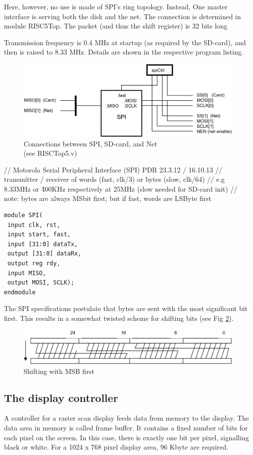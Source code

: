Here, however, no use is made of SPI's ring topology. Instead, One master interface is serving both the disk
and the net. The connection is determined in module RISC5Top. The packet (and thus the shift register)
is 32 bits long

Transmission frequency is 0.4 MHz at startup (as required by the SD-card), and then is raised to
8.33 MHz. Details are shown in the respective program listing.
\begin{figure}[h!]
  \centering
  \includegraphics[width=\textwidth]{i/G/7.png}
  \caption{Connections between SPI, SD-card, and Net\\(see RISCTop5.v)}
  \label{fig:spi}
\end{figure}

// Motorola Serial Peripheral Interface (SPI) PDR 23.3.12 / 16.10.13
// transmitter / receiver of words (fast, clk/3) or bytes (slow, clk/64)
// e.g 8.33MHz or \~400KHz respectively at 25MHz (slow needed for SD-card init)
// note: bytes are always MSbit first; but if fast, words are LSByte first
\begin{verbatim}
module SPI(
 input clk, rst,
 input start, fast,
 input [31:0] dataTx,
 output [31:0] dataRx,
 output reg rdy,
 input MISO,
 output MOSI, SCLK);
endmodule
\end{verbatim}

The SPI specifications postulate that bytes are sent with the most significant bit first. This results in
a somewhat twisted scheme for shifting bits (see Fig \ref{fig:msb}).
\begin{figure}[h!]
  \centering
  \includegraphics[width=\textwidth]{i/G/8.png}
  \caption{Shifting with MSB first}
  \label{fig:msb}
\end{figure}

\subsection{The display controller}
\label{sub:dispctrl}
A controller for a raster scan display feeds data from memory to the display. The data area in
memory is called frame buffer. It contains a fixed number of bits for each pixel on the screen. In this
case, there is exactly one bit per pixel, signalling black or white. For a 1024 x 768 pixel display
area, 96 Kbyte are required.

